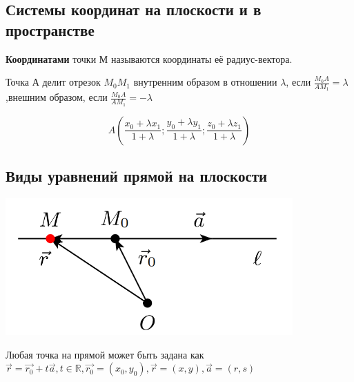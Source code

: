 \documentclass[a4paper]{article}
\begin{document}
    \newpage \begin{center}
                 \begin{Large}
                 \end{Large}
    \end{center}

    \subsection*{Системы координат на плоскости и в пространстве}
    \textbf{Координатами} точки $М$ называются координаты её радиус-вектора.

    Точка $А$ делит отрезок $M_0 M_1$ внутренним образом в отношении $\lambda$, если $\displaystyle \frac{M_0 A}{A M_1} = \lambda$,\newline внешним образом, если $\displaystyle \frac{M_0 A}{A M_1} = -\lambda$

    \begin{equation}
        \displaystyle A \left( \frac{x_0 + \lambda x_1}{1 + \lambda}; \frac{y_0 + \lambda y_1}{1 + \lambda}; \frac{z_0 + \lambda z_1}{1+\lambda}\right)
    \end{equation}

    \newpage \begin{center}
                 \begin{Large}
                 \end{Large}
    \end{center}

    \subsection*{Виды уравнений прямой на плоскости}

    \includegraphics[width=11cm]{t6}

    Любая точка на прямой может быть задана как $\vec{r} = \vec{r_0} + t\vec{a}, t \in \mathbb{R}, \vec{r_0} = (x_0, y_0), \vec{r} = (x,y), \vec{a} = (r, s)$
\end{document}
